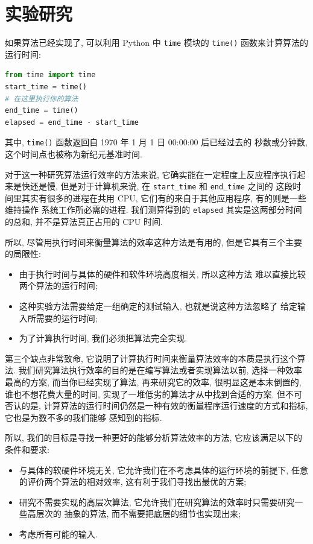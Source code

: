\documentclass[10pt,UTF8]{book} %
\begin{document}
\section{实验研究}

如果算法已经实现了, 可以利用 Python 中 \lstinline|time| 模块的 \lstinline|time()| 函数来计算算法的
运行时间:
\begin{lstlisting}[language=Python]
from time import time
start_time = time()
# 在这里执行你的算法
end_time = time()
elapsed = end_time - start_time
\end{lstlisting}
其中, \lstinline|time()| 函数返回自 1970 年 1 月 1 日 00:00:00 后已经过去的
秒数或分钟数, 这个时间点也被称为新纪元基准时间.

对于这一种研究算法运行效率的方法来说, 它确实能在一定程度上反应程序执行起来是快还是慢,
但是对于计算机来说, 在 \lstinline|start_time| 和 \lstinline|end_time| 之间的
这段时间里其实有很多的进程在共用 CPU, 它们有的来自于其他应用程序, 有的则是一些维持操作
系统工作所必需的进程. 我们测算得到的 \lstinline|elapsed| 其实是这两部分时间的总和,
并不是算法真正占用的 CPU 时间.

所以, 尽管用执行时间来衡量算法的效率这种方法是有用的, 但是它具有三个主要的局限性:
\begin{itemize}
    \item 由于执行时间与具体的硬件和软件环境高度相关, 所以这种方法
    难以直接比较两个算法的运行时间;
    \item 这种实验方法需要给定一组确定的测试输入, 也就是说这种方法忽略了
    给定输入所需要的运行时间;
    \item 为了计算执行时间, 我们必须把算法完全实现.
\end{itemize}
第三个缺点非常致命, 它说明了计算执行时间来衡量算法效率的本质是执行这个算法.
我们研究算法执行效率的目的是在编写算法或者实现算法以前, 选择一种效率
最高的方案, 而当你已经实现了算法, 再来研究它的效率, 很明显这是本末倒置的,
谁也不想花费大量的时间, 实现了一堆低劣的算法才从中找到合适的方案. 但不可否认的是,
计算算法的运行时间仍然是一种有效的衡量程序运行速度的方式和指标, 它也是为数不多的我们能够
感知到的指标.

所以, 我们的目标是寻找一种更好的能够分析算法效率的方法, 它应该满足以下的条件和要求:
\begin{itemize}
    \item 与具体的软硬件环境无关, 它允许我们在不考虑具体的运行环境的前提下,
    任意的评价两个算法的相对效率, 这有利于我们寻找出最优的方案;
    \item 研究不需要实现的高层次算法, 它允许我们在研究算法的效率时只需要研究一些高层次的
    抽象的算法, 而不需要把底层的细节也实现出来;
    \item 考虑所有可能的输入.
\end{itemize}
\end{document}
